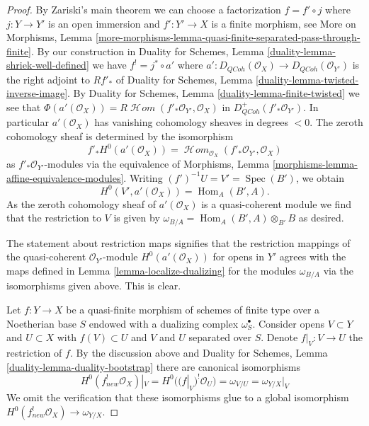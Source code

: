 \documentclass{stacks-project}
\theoremstyle{plain}
\theoremstyle{definition}
\theoremstyle{remark}
\numberwithin{equation}{subsection}
\def\Spec{\mathop{\mathrm{Spec}}}
\def\Hom{\mathop{\mathrm{Hom}}\nolimits}
\def\SheafHom{\mathop{\mathcal{H}\!\mathit{om}}\nolimits}
\def\QCoh{\mathit{QCoh}}
\begin{document}
\begin{proof}
By Zariski's main theorem we can choose a factorization $f = f' \circ j$
where $j : Y \to Y'$ is an open immersion and $f' : Y' \to X$ is a finite
morphism, see More on Morphisms, Lemma
\ref{more-morphisms-lemma-quasi-finite-separated-pass-through-finite}.
By our construction in
Duality for Schemes, Lemma \ref{duality-lemma-shriek-well-defined} we have
$f^! = j^* \circ a'$ where
$a' : D_\QCoh(\mathcal{O}_X) \to D_\QCoh(\mathcal{O}_{Y'})$
is the right adjoint to $Rf'_*$ of
Duality for Schemes, Lemma \ref{duality-lemma-twisted-inverse-image}.
By Duality for Schemes, Lemma \ref{duality-lemma-finite-twisted}
we see that
$\Phi(a'(\mathcal{O}_X)) = R\SheafHom(f'_*\mathcal{O}_{Y'}, \mathcal{O}_X)$ in
$D_\QCoh^+(f'_*\mathcal{O}_{Y'})$. In particular $a'(\mathcal{O}_X)$ has
vanishing cohomology sheaves in degrees $< 0$. The zeroth cohomology sheaf
is determined by the isomorphism
$$
f'_*H^0(a'(\mathcal{O}_X)) =
\SheafHom_{\mathcal{O}_X}(f'_*\mathcal{O}_{Y'}, \mathcal{O}_X)
$$
as $f'_*\mathcal{O}_{Y'}$-modules via the equivalence of
Morphisms, Lemma \ref{morphisms-lemma-affine-equivalence-modules}.
Writing $(f')^{-1}U = V' = \Spec(B')$, we obtain
$$
H^0(V', a'(\mathcal{O}_X)) = \Hom_A(B', A).
$$
As the zeroth cohomology sheaf of $a'(\mathcal{O}_X)$
is a quasi-coherent module we find that
the restriction to $V$ is given by
$\omega_{B/A} = \Hom_A(B', A) \otimes_{B'} B$ as desired.

\medskip\noindent
The statement about restriction maps signifies that the restriction mappings
of the quasi-coherent $\mathcal{O}_{Y'}$-module $H^0(a'(\mathcal{O}_X))$
for opens in $Y'$ agrees with the maps defined in
Lemma \ref{lemma-localize-dualizing}
for the modules $\omega_{B/A}$ via the isomorphisms given above.
This is clear.

\medskip\noindent
Let $f : Y \to X$ be a quasi-finite morphism of schemes of finite type
over a Noetherian base $S$ endowed with a dualizing complex $\omega_S^\bullet$.
Consider opens $V \subset Y$ and $U \subset X$ with $f(V) \subset U$
and $V$ and $U$ separated over $S$. Denote $f|_V : V \to U$ the restriction
of $f$. By the discussion above and
Duality for Schemes, Lemma \ref{duality-lemma-duality-bootstrap}
there are canonical isomorphisms
$$
H^0(f_{new}^!\mathcal{O}_X)|_V = H^0((f|_V)^!\mathcal{O}_U) = \omega_{V/U} =
\omega_{Y/X}|_V
$$
We omit the verification that these isomorphisms glue to a global
isomorphism $H^0(f_{new}^!\mathcal{O}_X) \to \omega_{Y/X}$.
\end{proof}
\end{document}
